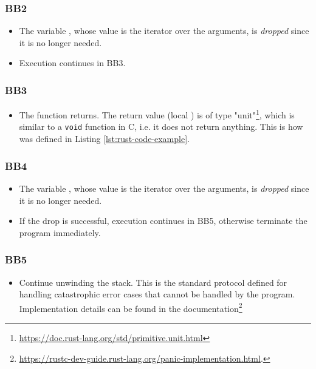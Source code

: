 \subsubsection{BB2}

\begin{itemize}
    \item The variable , whose value is the iterator over the arguments,
          is \emph{dropped} since it is no longer needed.
    \item Execution continues in BB3.
\end{itemize}

\subsubsection{BB3}

\begin{itemize}
    \item The function returns.
          The return value (local ) is of type "unit"\footnote{\url{https://doc.rust-lang.org/std/primitive.unit.html}},
          which is similar to a \texttt{void} function in C, i.e. it does not return anything.
          This is how  was defined in Listing \ref{lst:rust-code-example}.
\end{itemize}

\subsubsection{BB4}

\begin{itemize}
    \item The variable , whose value is the iterator over the arguments,
          is \emph{dropped} since it is no longer needed.
    \item If the drop is successful, execution continues in BB5,
          otherwise terminate the program immediately.
\end{itemize}

\subsubsection{BB5}

\begin{itemize}
    \item Continue unwinding the stack.
          This is the standard protocol defined for handling catastrophic error cases
          that cannot be handled by the program.
          Implementation details can be found in the
          documentation\footnote{\url{https://rustc-dev-guide.rust-lang.org/panic-implementation.html}.}
\end{itemize}